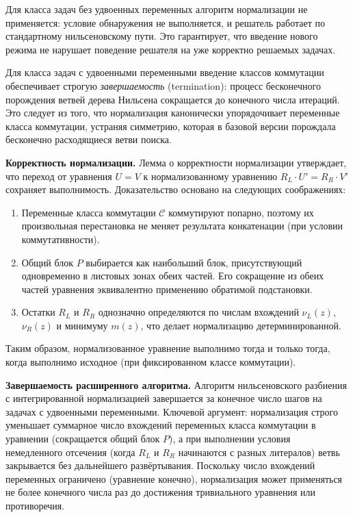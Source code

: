 \documentclass[14pt, russian]{scrartcl}
\begin{document}
Для класса задач без удвоенных переменных алгоритм нормализации не применяется:
условие обнаружения не выполняется, и решатель работает по стандартному
нильсеновскому пути. Это гарантирует, что введение нового режима не нарушает
поведение решателя на уже корректно решаемых задачах.

Для класса задач с удвоенными переменными введение классов коммутации обеспечивает
строгую \emph{завершаемость} (termination): процесс бесконечного порождения ветвей
дерева Нильсена сокращается до конечного числа итераций. Это следует из того,
что нормализация канонически упорядочивает переменные класса коммутации,
устраняя симметрию, которая в базовой версии порождала бесконечно расходящиеся
ветви поиска.

\medskip\noindent\textbf{Корректность нормализации.}
Лемма о корректности нормализации утверждает, что переход от уравнения $U = V$
к нормализованному уравнению $R_L \cdot U' = R_R \cdot V'$ сохраняет выполнимость.
Доказательство основано на следующих соображениях:
\begin{enumerate}
\item Переменные класса коммутации $\mathcal{C}$ коммутируют попарно, поэтому
  их произвольная перестановка не меняет результата конкатенации (при условии
  коммутативности).
\item Общий блок $P$ выбирается как наибольший блок, присутствующий одновременно
  в листовых зонах обеих частей. Его сокращение из обеих частей уравнения
  эквивалентно применению обратимой подстановки.
\item Остатки $R_L$ и $R_R$ однозначно определяются по числам вхождений
  $\nu_L(z)$, $\nu_R(z)$ и минимуму $m(z)$, что делает нормализацию детерминированной.
\end{enumerate}

Таким образом, нормализованное уравнение выполнимо тогда и только тогда, когда
выполнимо исходное (при фиксированном классе коммутации).

\medskip\noindent\textbf{Завершаемость расширенного алгоритма.}
Алгоритм нильсеновского разбиения с интегрированной нормализацией завершается
за конечное число шагов на задачах с удвоенными переменными. Ключевой аргумент:
нормализация строго уменьшает суммарное число вхождений переменных класса
коммутации в уравнении (сокращается общий блок $P$), а при выполнении условия
немедленного отсечения (когда $R_L$ и $R_R$ начинаются с разных литералов)
ветвь закрывается без дальнейшего развёртывания. Поскольку число вхождений
переменных ограничено (уравнение конечно), нормализация может применяться
не более конечного числа раз до достижения тривиального уравнения или
противоречия.
\end{document}
